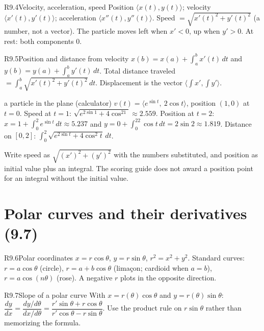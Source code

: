 \documentclass{apcalc}
\begin{document}
\begin{rulebox}{R9.4}{Velocity, acceleration, speed}
Position $\langle x(t),y(t)\rangle$; velocity $\langle x'(t),y'(t)\rangle$; acceleration $\langle x''(t),y''(t)\rangle$. Speed $=\sqrt{x'(t)^2+y'(t)^2}$ (a number, not a vector). The particle moves left when $x'<0$, up when $y'>0$. At rest: both components 0.
\end{rulebox}

\begin{rulebox}{R9.5}{Position and distance from velocity}
$x(b)=x(a)+\int_a^bx'(t)\,dt$ and $y(b)=y(a)+\int_a^by'(t)\,dt$. Total distance traveled $=\int_a^b\sqrt{x'(t)^2+y'(t)^2}\,dt$. Displacement is the vector $\langle\int x',\int y'\rangle$.
\end{rulebox}

\begin{example}{a particle in the plane (calculator)}
$v(t)=\langle e^{\sin t},\ 2\cos t\rangle$, position $(1,0)$ at $t=0$. Speed at $t=1$: $\sqrt{e^{2\sin1}+4\cos^21}\approx2.559$. Position at $t=2$: $x=1+\int_0^2e^{\sin t}\,dt\approx5.237$ and $y=0+\int_0^22\cos t\,dt=2\sin2\approx1.819$. Distance on $[0,2]$: $\int_0^2\sqrt{e^{2\sin t}+4\cos^2t}\,dt$.
\end{example}

\begin{frqtip}
Write speed as $\sqrt{(x')^2+(y')^2}$ with the numbers substituted, and position as initial value plus an integral. The scoring guide does not award a position point for an integral without the initial value.
\end{frqtip}

\section{Polar curves and their derivatives (9.7)}

\begin{rulebox}{R9.6}{Polar coordinates}
$x=r\cos\theta$, $y=r\sin\theta$, $r^2=x^2+y^2$. Standard curves: $r=a\cos\theta$ (circle), $r=a+b\cos\theta$ (lima\c{c}on; cardioid when $a=b$), $r=a\cos(n\theta)$ (rose). A negative $r$ plots in the opposite direction.
\end{rulebox}

\begin{rulebox}{R9.7}{Slope of a polar curve}
With $x=r(\theta)\cos\theta$ and $y=r(\theta)\sin\theta$: $\dfrac{dy}{dx}=\dfrac{dy/d\theta}{dx/d\theta}=\dfrac{r'\sin\theta+r\cos\theta}{r'\cos\theta-r\sin\theta}$. Use the product rule on $r\sin\theta$ rather than memorizing the formula.
\end{rulebox}
\end{document}
